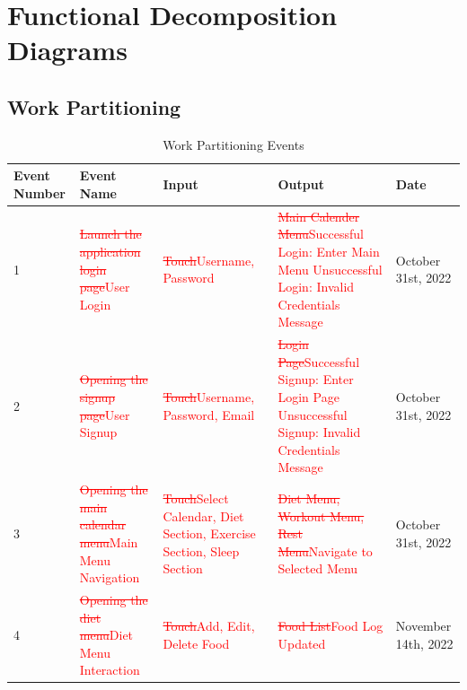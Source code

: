 \documentclass[12pt,letterpaper]{article}
\begin{document}
\section{Functional Decomposition Diagrams}

\subsection{Work Partitioning}
\begin{table}[h!]
	\caption{Work Partitioning Events}
	\centering
	\begin{tabularx}{\columnwidth}{|X|X|X|X|X|}
		\hline
		\centering\textbf{Event Number} & \centering\textbf{Event Name} & \centering\textbf{Input} & \centering\textbf{Output} & \textbf{Date}\\
		\hline
		1 & \textcolor{red}{\sout{Launch the application login page}}\newline \textcolor{red}{User Login} & \textcolor{red}{\sout{Touch}}\newline \textcolor{red}{Username, Password} & \textcolor{red}{\sout{Main Calender Menu}}\newline \textcolor{red}{Successful Login: Enter Main Menu \newline Unsuccessful Login: Invalid Credentials Message}  & October 31st, 2022\\
		\hline
		2 &  \textcolor{red}{\sout{Opening the signup page}}\newline \textcolor{red}{User Signup} & \textcolor{red}{\sout{Touch}}\newline \textcolor{red}{Username, Password, Email} & \textcolor{red}{\sout{Login Page}}\newline \textcolor{red}{Successful Signup: Enter Login Page \newline Unsuccessful Signup: Invalid Credentials Message} & October 31st, 2022\\
		\hline
		3 & \textcolor{red}{\sout{Opening the main calendar menu}}\newline \textcolor{red}{Main Menu Navigation} & \textcolor{red}{\sout{Touch}}\newline \textcolor{red}{Select Calendar, Diet Section, Exercise Section, Sleep Section} & \textcolor{red}{\sout{ Diet Menu, Workout Menu, Rest Menu}}\newline\textcolor{red}{Navigate to Selected Menu} & October 31st, 2022\\
		\hline
		4 & \textcolor{red}{\sout{Opening the diet menu}}\newline \textcolor{red}{Diet Menu Interaction} & \textcolor{red}{\sout{Touch}}\newline \textcolor{red}{Add, Edit, Delete Food} &\textcolor{red}{\sout{Food List}}\newline \textcolor{red}{Food Log Updated} & November 14th, 2022\\

\end{tabularx}
\end{table}
\end{document}
